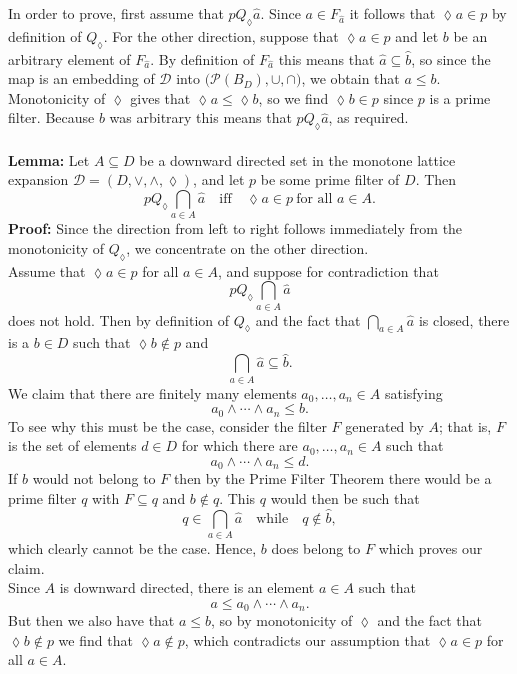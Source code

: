 \documentclass[12pt]{article}
\begin{document}
In order to prove, first assume that $p Q_{\lozenge} \widehat{a}$.  
Since $a \in F_{\widehat{a}}$ it follows that $\lozenge a \in p$ by definition of $Q_{\lozenge}$. For the other direction, suppose that $\lozenge a \in p$ and let $b$ be an arbitrary element of $F_{\widehat{a}}$.  
By definition of $F_{\widehat{a}}$ this means that $\widehat{a} \subseteq \widehat{b}$,  
so since the map is an embedding of $\mathcal{D}$ into $\bigl( \mathcal{P}(B_{D}), \cup, \cap)$, we obtain that $a \leq b$.  
Monotonicity of $\lozenge$ gives that $\lozenge a \leq \lozenge b$,  
so we find $\lozenge b \in p$ since $p$ is a prime filter.  
Because $b$ was arbitrary this means that $p Q_{\lozenge} \widehat{a}$, as required. \\ \\
\textbf{Lemma:}  
Let $A \subseteq D$ be a downward directed set in the monotone lattice expansion 
$\mathcal{D} = (D, \vee, \wedge, \lozenge)$, and let $p$ be some prime filter of $D$.  
Then
\[
p Q_{\lozenge} \bigcap_{a \in A} \widehat{a} 
\quad \text{iff} \quad 
\lozenge a \in p \ \text{for all } a \in A.
\]
\textbf{Proof:}  
Since the direction from left to right follows immediately from the monotonicity of $Q_{\lozenge}$, 
we concentrate on the other direction.\\
Assume that $\lozenge a \in p$ for all $a \in A$, and suppose for contradiction that 
\[
p Q_{\lozenge} \bigcap_{a \in A} \widehat{a}
\]
does not hold.  
Then by definition of $Q_{\lozenge}$ and the fact that $\bigcap_{a \in A} \widehat{a}$ is closed, 
there is a $b \in D$ such that $\lozenge b \notin p$ and 
\[
\bigcap_{a \in A} \widehat{a} \subseteq \widehat{b}.
\]
We claim that there are finitely many elements $a_{0}, \dots, a_{n} \in A$ satisfying
\[
a_{0} \wedge \cdots \wedge a_{n} \leq b.
\]
To see why this must be the case, consider the filter $F$ generated by $A$; 
that is, $F$ is the set of elements $d \in D$ for which there are $a_{0}, \dots, a_{n} \in A$ such that 
\[
a_{0} \wedge \cdots \wedge a_{n} \leq d.
\]
If $b$ would not belong to $F$ then by the Prime Filter Theorem there would be a prime filter $q$ with $F \subseteq q$ and $b \notin q$.  
This $q$ would then be such that 
\[
q \in \bigcap_{a \in A} \widehat{a} \quad \text{while} \quad q \notin \widehat{b},
\]
which clearly cannot be the case.  
Hence, $b$ does belong to $F$ which proves our claim.\\
Since $A$ is downward directed, there is an element $a \in A$ such that 
\[
a \leq a_{0} \wedge \cdots \wedge a_{n}.
\]
But then we also have that $a \leq b$, so by monotonicity of $\lozenge$ and the fact that $\lozenge b \notin p$ we find that $\lozenge a \notin p$, which contradicts our assumption that $\lozenge a \in p$ for all $a \in A$. 
\end{document}
